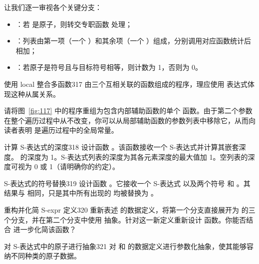 让我们逐一审视各个关键分支：
\begin{itemize}
  \item {}：若  是原子，则转交专职函数  处理；
  \item {}：列表由第一项（一个 ）和其余项（一个 ）组成，分别调用对应函数统计后相加；
  \item \code{[(symbol? at) (if (symbol=? at sy) 1 0)]}：若原子是符号且与目标符号相等，则计数为 1，否则为 0。
\end{itemize}

\begin{exercise}{使用 local 整合多函数}{317}
由三个互相关联的函数组成的程序，理应使用  表达式体现这种从属关系。

请将图~\ref{fig:117} 中的程序重组为包含内部辅助函数的单个  函数。由于第二个参数  在整个遍历过程中从不改变，你可以从局部辅助函数的参数列表中移除它，从而向读者表明  是遍历过程中的全局常量。
\end{exercise}

\begin{exercise}{计算 S-表达式的深度}{318}
设计函数 。该函数接收一个 S-表达式并计算其嵌套深度。 的深度为 1。S-表达式列表的深度为其各元素深度的最大值加 1。空列表的深度可视为 0 或 1（请明确你的约定）。
\end{exercise}

\begin{exercise}{S-表达式的符号替换}{319}
设计函数 。它接收一个 S-表达式  以及两个符号  和 。其结果与  相同，只是其中所有出现的  均被替换为 。
\end{exercise}

\begin{exercise}{重构并化简 S-expr 定义}{320}
重新表述  的数据定义，将第一个分支直接展开为  的三个分支，并在第二个分支中使用  抽象。针对这一新定义重新设计  函数。你能否结合  进一步化简该函数？
\end{exercise}

\begin{exercise}{对 S-表达式中的原子进行抽象}{321}
对  和  的数据定义进行参数化抽象，使其能够容纳不同种类的原子数据。
\end{exercise}

